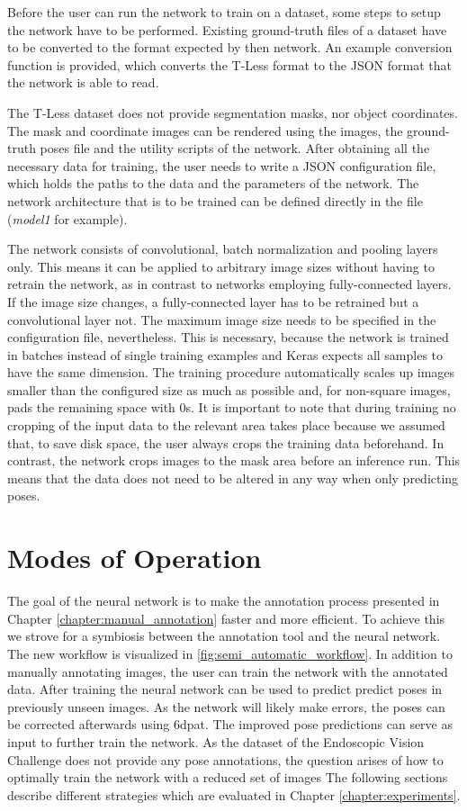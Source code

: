 Before the user can run the network to train on a dataset, some steps to setup the network have to be performed. Existing ground-truth files of a dataset have to be converted to the format expected by then network. An example conversion function is provided, which converts the T-Less format to the JSON format that the network is able to read. 

The T-Less dataset does not provide segmentation masks, nor object coordinates. The mask and coordinate images can be rendered using the images, the ground-truth poses file and the utility scripts of the network. After obtaining all the necessary data for training, the user needs to write a JSON configuration file, which holds the paths to the data and the parameters of the network. The network architecture that is to be trained can be defined directly in the file (\textit{model1} for example). 

The network consists of convolutional, batch normalization and pooling layers only. This means it can be applied to arbitrary image sizes without having to retrain the network, as in contrast to networks employing fully-connected layers. If the image size changes, a fully-connected layer has to be retrained but a convolutional layer not. The maximum image size needs to be specified in the configuration file, nevertheless. This is necessary, because the network is trained in batches instead of single training examples and Keras expects all samples to have the same dimension. The training procedure automatically scales up images smaller than the configured size as much as possible and, for non-square images, pads the remaining space with 0s. It is important to note that during training no cropping of the input data to the relevant area takes place because we assumed that, to save disk space, the user always crops the training data beforehand. In contrast, the network crops images to the mask area before an inference run. This means that the data does not need to be altered in any way when only predicting poses.

\section{Modes of Operation} \label{section:modes_of_operation}

The goal of the neural network is to make the annotation process presented in Chapter \ref{chapter:manual_annotation} faster and more efficient. To achieve this we strove for a symbiosis between the annotation tool and the neural network. The new workflow is visualized in \fig \ref{fig:semi_automatic_workflow}. In addition to manually annotating images, the user can train the network with the annotated data. After training the neural network can be used to predict predict poses in previously unseen images. As the network will likely make errors, the poses can be corrected afterwards using \ac{6dpat}. The improved pose predictions can serve as input to further train the network. As the dataset of the Endoscopic Vision Challenge does not provide any pose annotations, the question arises of how to optimally train the network with a reduced set of images The following sections describe different strategies which are evaluated in Chapter \ref{chapter:experiments}.

